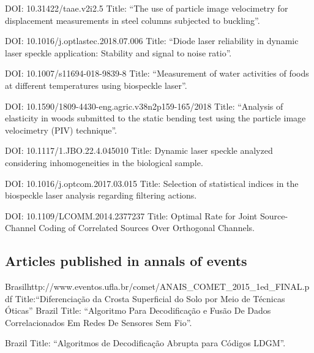 \documentclass[11pt,a4paper,sans]{moderncv} %
\begin{document}
	      {DOI: 10.31422/taae.v2i2.5}{}{}
	      {Title: ``The use of particle image velocimetry for displacement measurements in steel columns subjected to buckling''.}
	      
	      {DOI: 10.1016/j.optlastec.2018.07.006}{}{}
	      {Title: ``Diode laser reliability in dynamic laser speckle application: Stability and signal to noise ratio''.}
	      
	      {DOI: 10.1007/s11694-018-9839-8}{}{}
	      {Title: ``Measurement of water activities of foods at different temperatures using biospeckle laser''.}

	      {DOI: 10.1590/1809-4430-eng.agric.v38n2p159-165/2018}{}{}
	      {Title: ``Analysis of elasticity in woods submitted to the static bending test using the particle image velocimetry (PIV) technique''.}

	      {DOI: 10.1117/1.JBO.22.4.045010}{}{}
	      {Title: Dynamic laser speckle analyzed considering inhomogeneities in the biological sample.}
	      
	      {DOI: 10.1016/j.optcom.2017.03.015}{}{}
	      {Title: Selection of statistical indices in the biospeckle laser analysis regarding filtering actions.}
	      
	      {DOI: 10.1109/LCOMM.2014.2377237}{}{}
	      {Title: Optimal  Rate for Joint Source-Channel Coding of Correlated Sources Over Orthogonal Channels.}

\subsection{Articles published in annals of events}
	      {Brasil}{}{http://www.eventos.ufla.br/comet/ANAIS\_COMET\_2015\_1ed\_FINAL.pdf}
	      {Title:``Diferenciação da Crosta Superficial do Solo por Meio de Técnicas Óticas''}
	      {Brazil}{}{}
	      {Title: ``Algoritmo Para Decodificação e Fusão De Dados Correlacionados Em Redes De Sensores Sem Fio''.}

	      {Brazil}{}{}
	      {Title: ``Algoritmos de Decodificação Abrupta para Códigos LDGM''.}
\end{document}
